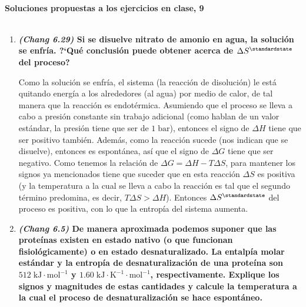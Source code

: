 \documentclass[a4paper,12pt]{article}
\begin{document}

\begin{center}
\HRule \\[0.4cm]
{ \bfseries Soluciones propuestas a los ejercicios en clase, 9}\\ %
\HRule \\[0.4cm]
\end{center}


\begin{enumerate}

 \item \textbf{\textit{(Chang 6.29)} Si se disuelve nitrato de amonio en agua, la soluci\'on se enfr\'ia. ?`Qu\'e conclusi\'on puede obtener acerca de $\Delta S^\standardstate$ del proceso?} %

Como la soluci\'on se enfr\'ia, el sistema (la reacci\'on de disoluci\'on) le est\'a quitando energ\'ia a los alrededores (al agua) por medio de calor, de tal manera que la reacci\'on es endot\'ermica. Asumiendo que el proceso se lleva a cabo a presi\'on constante sin trabajo adicional (como hablan de un valor est\'andar, la presi\'on tiene que ser de $1\;\mbox{bar}$), entonces el signo de $\Delta H$ tiene que ser positivo tambi\'en. Adem\'as, como la reacci\'on sucede (nos indican que se disuelve), entonces es espont\'anea, as\'i que el signo de $\Delta G$ tiene que ser negativo. Como tenemos la relaci\'on de $\Delta G=\Delta H-T\Delta S$, para mantener los signos ya mencionados tiene que suceder que en esta reacci\'on $\Delta S$ es positiva (y la temperatura a la cual se lleva a cabo la reacci\'on es tal que el segundo t\'ermino predomina, es decir, $T\Delta S>\Delta H$). Entonces $\Delta S^\standardstate$ del proceso es positiva, con lo que la entrop\'ia del sistema aumenta.

 \item \textbf{\textit{(Chang 6.5)} De manera aproximada podemos suponer que las prote\'inas existen en estado nativo (o que funcionan fisiol\'ogicamente) o en estado desnaturalizado. La entalp\'ia molar est\'andar y la entrop\'ia de desnaturalizaci\'on de una prote\'ina son $512\;\mbox{kJ}\cdot\mbox{mol}^{-1}$ y $1.60\;\mbox{kJ}\cdot\mbox{K}^{-1}\cdot\mbox{mol}^{-1}$, respectivamente. Explique los signos y magnitudes de estas cantidades y calcule la temperatura a la cual el proceso de desnaturalizaci\'on se hace espont\'aneo.} %


\end{enumerate}
\end{document}
